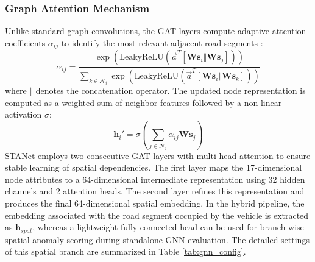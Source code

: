 \documentclass[journal]{IEEEtran}
\begin{document}
\subsubsection{Graph Attention Mechanism}
Unlike standard graph convolutions, the GAT layers compute adaptive attention coefficients $\alpha_{ij}$ to identify the most relevant adjacent road segments \cite{xia_attention-based_2023, ren_graph_2024, chen_gms_2026}:
\begin{equation}
  \alpha_{ij} = \frac{\exp\left(\text{LeakyReLU}\left(\vec{a}^T [\mathbf{W}\mathbf{s}_i \Vert \mathbf{W}\mathbf{s}_j]\right)\right)}{\sum_{k \in \mathcal{N}_i} \exp\left(\text{LeakyReLU}\left(\vec{a}^T [\mathbf{W}\mathbf{s}_i \Vert \mathbf{W}\mathbf{s}_k]\right)\right)}
\end{equation}
where $\Vert$ denotes the concatenation operator. The updated node representation is computed as a weighted sum of neighbor features followed by a non-linear activation $\sigma$:
\begin{equation}
  \mathbf{h}_i' = \sigma \left( \sum_{j \in \mathcal{N}_i} \alpha_{ij} \mathbf{W}\mathbf{s}_j \right)
\end{equation}
STANet employs two consecutive GAT layers with multi-head attention to ensure stable learning of spatial dependencies. The first layer maps the 17-dimensional node attributes to a 64-dimensional intermediate representation using 32 hidden channels and 2 attention heads. The second layer refines this representation and produces the final 64-dimensional spatial embedding. In the hybrid pipeline, the embedding associated with the road segment occupied by the vehicle is extracted as $\mathbf{h}_{spat}$, whereas a lightweight fully connected head can be used for branch-wise spatial anomaly scoring during standalone GNN evaluation. The detailed settings of this spatial branch are summarized in Table \ref{tab:gnn_config}.
\end{document}
